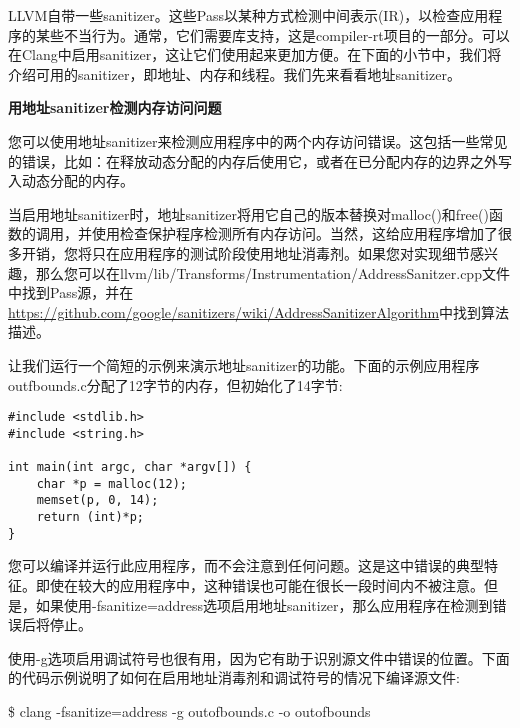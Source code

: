 
LLVM自带一些sanitizer。这些Pass以某种方式检测中间表示(IR)，以检查应用程序的某些不当行为。通常，它们需要库支持，这是compiler-rt项目的一部分。可以在Clang中启用sanitizer，这让它们使用起来更加方便。在下面的小节中，我们将介绍可用的sanitizer，即地址、内存和线程。我们先来看看地址sanitizer。\par

\hspace*{\fill} \par %
\textbf{用地址sanitizer检测内存访问问题}

您可以使用地址sanitizer来检测应用程序中的两个内存访问错误。这包括一些常见的错误，比如：在释放动态分配的内存后使用它，或者在已分配内存的边界之外写入动态分配的内存。\par

当启用地址sanitizer时，地址sanitizer将用它自己的版本替换对malloc()和free()函数的调用，并使用检查保护程序检测所有内存访问。当然，这给应用程序增加了很多开销，您将只在应用程序的测试阶段使用地址消毒剂。如果您对实现细节感兴趣，那么您可以在llvm/lib/Transforms/\allowbreak Instrumentation/AddressSanitzer.cpp文件中找到Pass源，并在\url{https://github.com/google/sanitizers/wiki/AddressSanitizerAlgorithm}中找到算法描述。\par

让我们运行一个简短的示例来演示地址sanitizer的功能。下面的示例应用程序outfbounds.c分配了12字节的内存，但初始化了14字节:\par

\begin{lstlisting}[caption={}]
#include <stdlib.h>
#include <string.h>

int main(int argc, char *argv[]) {
	char *p = malloc(12);
	memset(p, 0, 14);
	return (int)*p;
}
\end{lstlisting}

您可以编译并运行此应用程序，而不会注意到任何问题。这是这中错误的典型特征。即使在较大的应用程序中，这种错误也可能在很长一段时间内不被注意。但是，如果使用-fsanitize=address选项启用地址sanitizer，那么应用程序在检测到错误后将停止。\par

使用-g选项启用调试符号也很有用，因为它有助于识别源文件中错误的位置。下面的代码示例说明了如何在启用地址消毒剂和调试符号的情况下编译源文件:\par

\begin{tcolorbox}[colback=white,colframe=black]
\$ clang -fsanitize=address -g outofbounds.c -o outofbounds
\end{tcolorbox}

